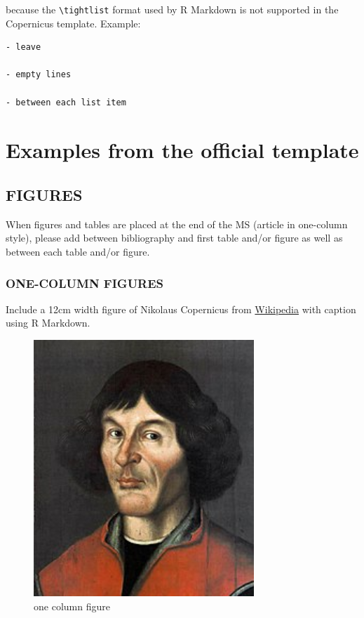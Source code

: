 \documentclass[gc, manuscript]{copernicus}
\begin{document}
because the \texttt{\textbackslash{}tightlist} format used by R Markdown
is not supported in the Copernicus template. Example:

\begin{verbatim}
- leave

- empty lines

- between each list item
\end{verbatim}

\section{Examples from the official template}

\subsection{FIGURES}

When figures and tables are placed at the end of the MS (article in
one-column style), please add \clearpage between bibliography and first
table and/or figure as well as between each table and/or figure.

\subsubsection{ONE-COLUMN FIGURES}

Include a 12cm width figure of Nikolaus Copernicus from
\href{https://en.wikipedia.org/wiki/File:Nikolaus_Kopernikus.jpg}{Wikipedia}
with caption using R Markdown.

\begin{figure}
\includegraphics[width=8.3cm]{Nikolaus_Kopernikus} \caption{one column figure}\label{fig:unnamed-chunk-2}
\end{figure}
\end{document}
